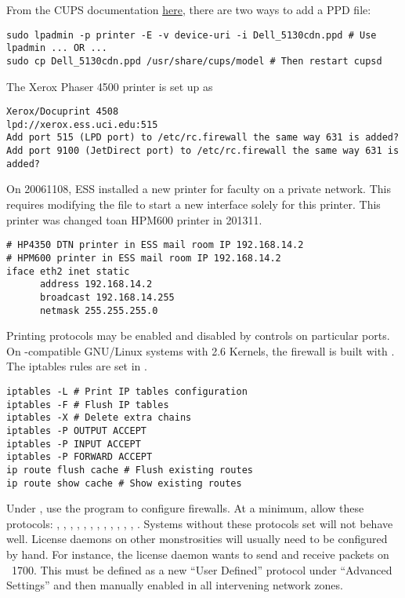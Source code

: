 \documentclass[12pt,twoside]{article}
\begin{document}
From the CUPS documentation 
\href{http://www.cups.org/articles.php?L271+THow-To+Q}{here},
there are two ways to add a PPD file:
\begin{verbatim}
sudo lpadmin -p printer -E -v device-uri -i Dell_5130cdn.ppd # Use lpadmin ... OR ...
sudo cp Dell_5130cdn.ppd /usr/share/cups/model # Then restart cupsd
\end{verbatim}

The Xerox Phaser 4500 printer is set up as 
\begin{verbatim}
Xerox/Docuprint 4508
lpd://xerox.ess.uci.edu:515
Add port 515 (LPD port) to /etc/rc.firewall the same way 631 is added?
Add port 9100 (JetDirect port) to /etc/rc.firewall the same way 631 is added?
\end{verbatim}

On 20061108, ESS installed a new printer for faculty on a private network.
This requires modifying the  file to start a new
interface solely for this printer.
This printer was changed toan HPM600 printer in 201311.
\begin{verbatim}
# HP4350 DTN printer in ESS mail room IP 192.168.14.2
# HPM600 printer in ESS mail room IP 192.168.14.2
iface eth2 inet static
      address 192.168.14.2
      broadcast 192.168.14.255
      netmask 255.255.255.0
\end{verbatim}

Printing protocols may be enabled and disabled by 
controls on particular ports.
On -compatible GNU/Linux systems with 2.6 Kernels, the
firewall is built with .
The iptables rules are set in .
\begin{verbatim}
iptables -L # Print IP tables configuration
iptables -F # Flush IP tables
iptables -X # Delete extra chains
iptables -P OUTPUT ACCEPT
iptables -P INPUT ACCEPT
iptables -P FORWARD ACCEPT
ip route flush cache # Flush existing routes
ip route show cache # Show existing routes
\end{verbatim}
Under , use the  program to configure
firewalls.
At a minimum, allow these protocols: 
, 
, 
, 
, 
, 
, 
, 
, 
, 
, 
, 
, 
.
Systems without these protocols set will not behave well.
License daemons on other monstrosities will usually need to be
configured by hand.
For instance, the  license daemon wants to send and
receive  packets on ~1700.
This must be defined as a new ``User Defined'' protocol under
``Advanced Settings'' and then manually enabled in all intervening
network zones.
\end{document}
